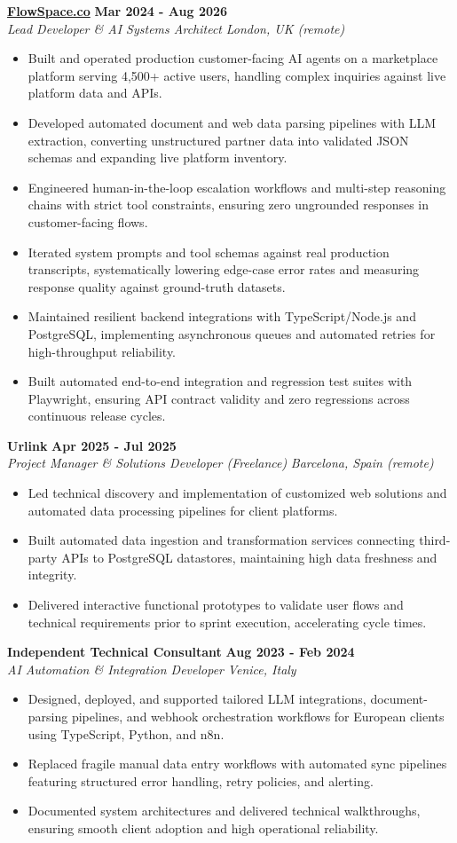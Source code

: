 \documentclass[10pt,a4paper]{article}
\newcommand{\role}[4]{%
  \textbf{#1} \hfill \textbf{#2}\\[1pt]%
  \textit{#3} \hfill \textit{#4}\\[2pt]%
}
\begin{document}
\role{\href{https://flowspace.co}{FlowSpace.co}}{Mar 2024 - Aug 2026}{Lead Developer \& AI Systems Architect}{London, UK (remote)}
\begin{itemize}
  \item Built and operated production customer-facing AI agents on a marketplace platform serving 4,500+ active users, handling complex inquiries against live platform data and APIs.
  \item Developed automated document and web data parsing pipelines with LLM extraction, converting unstructured partner data into validated JSON schemas and expanding live platform inventory.
  \item Engineered human-in-the-loop escalation workflows and multi-step reasoning chains with strict tool constraints, ensuring zero ungrounded responses in customer-facing flows.
  \item Iterated system prompts and tool schemas against real production transcripts, systematically lowering edge-case error rates and measuring response quality against ground-truth datasets.
  \item Maintained resilient backend integrations with TypeScript/Node.js and PostgreSQL, implementing asynchronous queues and automated retries for high-throughput reliability.
  \item Built automated end-to-end integration and regression test suites with Playwright, ensuring API contract validity and zero regressions across continuous release cycles.
\end{itemize}

\role{Urlink}{Apr 2025 - Jul 2025}{Project Manager \& Solutions Developer (Freelance)}{Barcelona, Spain (remote)}
\begin{itemize}
  \item Led technical discovery and implementation of customized web solutions and automated data processing pipelines for client platforms.
  \item Built automated data ingestion and transformation services connecting third-party APIs to PostgreSQL datastores, maintaining high data freshness and integrity.
  \item Delivered interactive functional prototypes to validate user flows and technical requirements prior to sprint execution, accelerating cycle times.
\end{itemize}

\role{Independent Technical Consultant}{Aug 2023 - Feb 2024}{AI Automation \& Integration Developer}{Venice, Italy}
\begin{itemize}
  \item Designed, deployed, and supported tailored LLM integrations, document-parsing pipelines, and webhook orchestration workflows for European clients using TypeScript, Python, and n8n.
  \item Replaced fragile manual data entry workflows with automated sync pipelines featuring structured error handling, retry policies, and alerting.
  \item Documented system architectures and delivered technical walkthroughs, ensuring smooth client adoption and high operational reliability.
\end{itemize}
\end{document}
